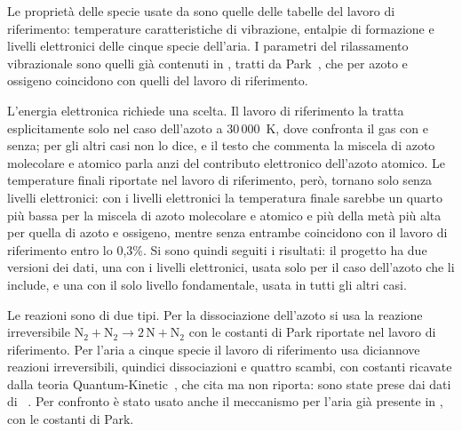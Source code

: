 Le proprietà delle specie usate da \mpp{} sono quelle delle tabelle del lavoro
di riferimento: temperature caratteristiche di vibrazione, entalpie di
formazione e livelli elettronici delle cinque specie dell'aria. I parametri del
rilassamento vibrazionale sono quelli già contenuti in \mpp, tratti da
Park~\cite{park1993}, che per azoto e ossigeno coincidono con quelli del lavoro
di riferimento.

L'energia elettronica richiede una scelta. Il lavoro di riferimento la tratta
esplicitamente solo nel caso dell'azoto a 30\,000~K, dove confronta il gas con
e senza; per gli altri casi non lo dice, e il testo che commenta la miscela di
azoto molecolare e atomico parla anzi del contributo elettronico dell'azoto
atomico. Le temperature finali riportate nel lavoro di riferimento, però, tornano solo
senza livelli elettronici: con i livelli elettronici la temperatura finale sarebbe
un quarto più bassa per la miscela di azoto molecolare e atomico e più della
metà più alta per quella di azoto e ossigeno, mentre senza entrambe coincidono
con il lavoro di riferimento entro lo 0{,}3\%. Si sono quindi seguiti i risultati: il progetto ha due versioni dei
dati, una con i livelli elettronici, usata solo per il caso dell'azoto che li
include, e una con il solo livello fondamentale, usata in tutti gli altri
casi.

Le reazioni sono di due tipi. Per la dissociazione dell'azoto si usa la
reazione irreversibile $\mathrm{N_2 + N_2 \rightarrow 2\,N + N_2}$ con le
costanti di Park riportate nel lavoro di riferimento. Per l'aria a cinque
specie il lavoro di riferimento usa diciannove reazioni irreversibili, quindici
dissociazioni e quattro scambi, con costanti ricavate dalla teoria
Quantum-Kinetic~\cite{scanlon2015}, che cita ma non riporta: sono state prese
dai dati di \hyfoam~\cite{hystrath}. Per confronto è stato usato anche il
meccanismo per l'aria già presente in \mpp, con le costanti di Park.

